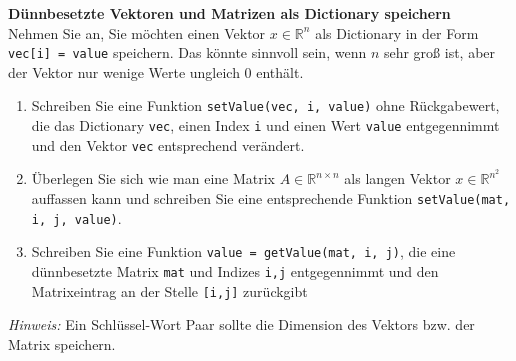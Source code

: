 \textbf{Dünnbesetzte Vektoren und Matrizen als Dictionary speichern}\\
Nehmen Sie an, Sie möchten einen Vektor $x \in \mathbb{R}^n$ als Dictionary in der Form \verb|vec[i] = value| speichern. Das könnte sinnvoll sein, wenn $n$ sehr groß ist, aber der Vektor nur wenige Werte ungleich 0 enthält.
\begin{enumerate}
	\item Schreiben Sie eine Funktion \verb|setValue(vec, i, value)| ohne Rückgabewert, die das Dictionary \verb|vec|, einen Index \verb|i| und einen Wert \verb|value| entgegennimmt und den Vektor \texttt{vec} entsprechend verändert. 
	\item Überlegen Sie sich wie man eine Matrix $A \in \mathbb{R}^{n\times n}$ als langen Vektor $x \in \mathbb{R}^{n^2}$ auffassen kann und schreiben Sie eine entsprechende Funktion \verb|setValue(mat, i, j, value)|.
	\item Schreiben Sie eine Funktion \verb|value = getValue(mat, i, j)|, die eine dünnbesetzte Matrix \texttt{mat} und Indizes \texttt{i,j} entgegennimmt und den Matrixeintrag an der Stelle \texttt{[i,j]} zurückgibt 
\end{enumerate}
\textit{Hinweis:} Ein Schlüssel-Wort Paar sollte die Dimension des Vektors bzw. der Matrix speichern.